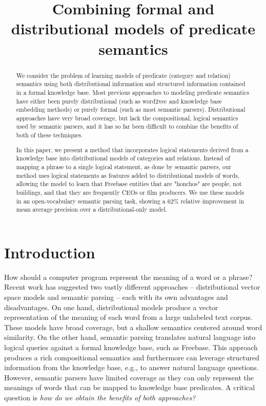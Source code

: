 \documentclass[11pt]{article}
\title{Combining formal and distributional models of predicate semantics}
\author{}%
\date{}
\begin{document}
\maketitle

\begin{abstract}

  We consider the problem of learning models of predicate (category and
  relation) semantics using both distributional information and structured
  information contained in a formal knowledge base.  Most previous approaches
  to modeling predicate semantics have either been purely distributional (such
  as word2vec and knowledge base embedding methods) or purely formal (such as
  most semantic parsers).  Distributional approaches have very broad coverage,
  but lack the compositional, logical semantics used by semantic parsers, and
  it has so far been difficult to combine the benefits of both of these
  techniques.

  In this paper, we present a method that incorporates logical statements
  derived from a knowledge base into distributional models of categories and
  relations.  Instead of mapping a phrase to a single logical statement, as
  done by semantic parsers, our method uses logical statements as features
  added to distributional models of words, allowing the model to learn that
  Freebase entities that are "honchos" are people, not buildings, and that they
  are frequently CEOs or film producers.  We use these models in an
  open-vocabulary semantic parsing task, showing a 62\% relative improvement in
  mean average precision over a distributional-only model.

\end{abstract}

\section{Introduction}

How should a computer program represent the meaning of a word or a
phrase? Recent work has suggested two vastly different approaches --
distributional vector space models and semantic parsing -- each with
its own advantages and disadvantages. On one hand, distributional
models produce a vector representation of the meaning of each word
from a large unlabeled text corpus. These models have broad coverage,
but a shallow semantics centered around word similarity. On the other
hand, semantic parsing translates natural language into logical
queries against a formal knowledge base, such as Freebase. This
approach produces a rich compositional semantics and furthermore can
leverage structured information from the knowledge base, e.g., to
answer natural language questions. However, semantic parsers have
limited coverage as they can only represent the meanings of words that
can be mapped to knowledge base predicates. A critical question is
\emph{how do we obtain the benefits of both approaches?}
\end{document}

